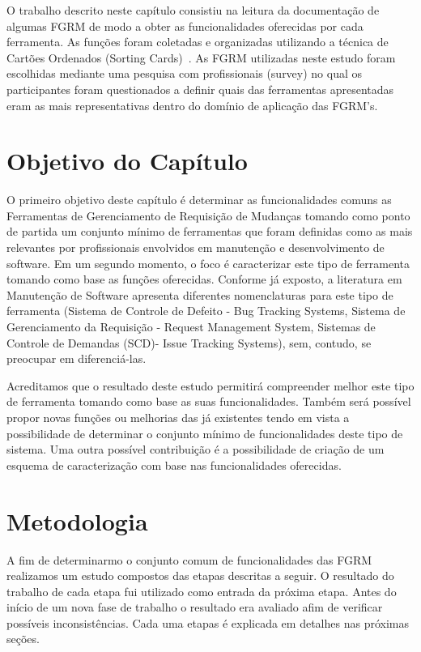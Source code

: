 O trabalho descrito neste capítulo consistiu na leitura da documentação de
algumas FGRM de modo a obter as funcionalidades oferecidas por cada ferramenta.
As funções foram coletadas e organizadas utilizando a técnica de Cartões
Ordenados (Sorting Cards)~\cite{5070993}. As FGRM utilizadas neste estudo foram
escolhidas mediante uma pesquisa com profissionais (survey) no qual os
participantes foram questionados a definir quais das ferramentas apresentadas
eram as mais representativas dentro do domínio de aplicação das FGRM's.

\section{Objetivo do Capítulo}
\label{sec:objetivo_do_capítulo}

O primeiro objetivo deste capítulo é determinar as funcionalidades comuns as
Ferramentas de Gerenciamento de Requisição de Mudanças tomando como ponto de
partida um conjunto mínimo de ferramentas que foram definidas como as mais
relevantes por profissionais envolvidos em manutenção e desenvolvimento de
software. Em um segundo momento, o foco é caracterizar este tipo de ferramenta
tomando como base as funções oferecidas.  Conforme já exposto, a literatura em
Manutenção de Software apresenta diferentes nomenclaturas para este tipo de
ferramenta (Sistema de Controle de Defeito - Bug Tracking Systems, Sistema de
Gerenciamento da Requisição - Request Management System, Sistemas de Controle de
Demandas (SCD)- Issue Tracking Systems), sem, contudo, se preocupar em
diferenciá-las.

Acreditamos que o resultado deste estudo permitirá compreender melhor este tipo
de ferramenta tomando como base as suas funcionalidades. Também será possível
propor novas funções ou melhorias das já existentes tendo em vista a
possibilidade de determinar o conjunto mínimo de funcionalidades deste tipo de
sistema. Uma outra possível contribuição é a possibilidade de criação de um
esquema de caracterização com base nas funcionalidades oferecidas.

\section{Metodologia}
\label{sec:metodologia}

A fim de determinarmo o conjunto comum de funcionalidades das FGRM realizamos um
estudo compostos das etapas descritas a seguir. O resultado do trabalho de cada
etapa fui utilizado como entrada da próxima etapa. Antes do início de um nova
fase de trabalho o resultado era avaliado afim de verificar possíveis
inconsistências. Cada uma etapas é explicada em detalhes nas próximas seções. 

